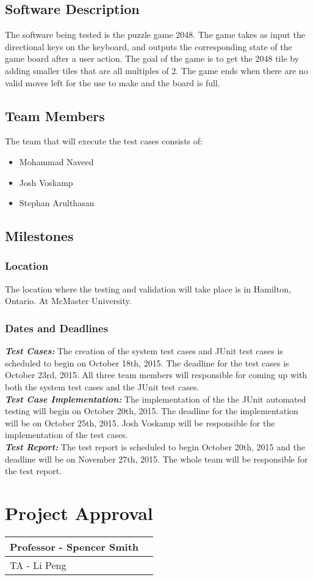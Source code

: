 \documentclass[12pt]{article}
\begin{document}
\subsection{Software Description}
The software being tested is the puzzle game 2048. The game takes as input the directional keys on the keyboard, and outputs the corresponding state of the game board after a user action. The goal of the game is to get the 2048 tile by adding smaller tiles that are all multiples of 2. The game ends when there are no valid moves left for the use to make and the board is full.

\subsection{Team Members}
The team that will execute the test cases consists of:

\begin{itemize}
	\item Mohammad Naveed
	\item Josh Voskamp
	\item Stephan Arulthasan
\end{itemize}

\subsection{Milestones}

\subsubsection{Location}
The location where the testing and validation will take place is in Hamilton, Ontario. At McMaster University.

\subsubsection{Dates and Deadlines}
\textbf{\emph{Test Cases:}}
The creation of the system test cases and JUnit test cases is scheduled to begin on October 18th, 2015. The deadline for the test cases is October 23rd, 2015. All three team members will responsible for coming up with both the system test cases and the JUnit test cases.\\
\textbf{\emph{Test Case Implementation:}}
The implementation of the the JUnit automated testing will begin on October 20th, 2015. The deadline for the implementation will be on October 25th, 2015. Josh Voskamp will be responsible for the implementation of the test cases.\\
\textbf{\emph{Test Report:}}
The test report is scheduled to begin October 20th, 2015 and the deadline will be on November 27th, 2015. The whole team will be responsible for the test report.

\section{Project Approval}

\begin{center}
	\begin{tabular}{ | p{5cm} | p{5cm} |}
		\hline
		Professor - Spencer Smith &  \\ \hline
		TA - Li Peng &  \\ \hline
	\end{tabular}
\end{center}
\end{document}
